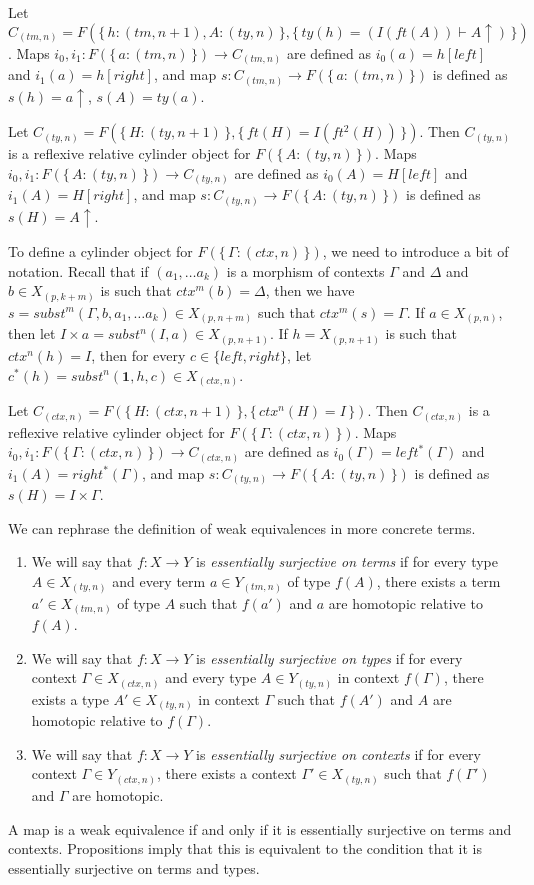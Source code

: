 \documentclass[reqno]{amsart}
\theoremstyle{definition}
\theoremstyle{remark}
\newcommand{\emptyCtx}{\mathbf{1}}
\newcommand{\cyli}{i}
\numberwithin{figure}{section}
\begin{document}
Let $C_{(tm,n)} = F(\{\,h : (tm,n+1), A : (ty,n)\,\}, \{\,ty(h) = (I(ft(A)) \vdash A\!\!\uparrow)\,\})$.
Maps $\cyli_0, \cyli_1 : F(\{\,a : (tm,n)\,\}) \to C_{(tm,n)}$ are defined as $\cyli_0(a) = h[left]$ and $\cyli_1(a) = h[right]$,
and map $s : C_{(tm,n)} \to F(\{\,a : (tm,n)\,\})$ is defined as $s(h) = a\!\!\uparrow$, $s(A) = ty(a)$.

Let $C_{(ty,n)} = F(\{\,H : (ty,n+1)\,\}, \{\,ft(H) = I(ft^2(H))\,\})$.
Then $C_{(ty,n)}$ is a reflexive relative cylinder object for $F(\{\,A : (ty,n)\,\})$.
Maps $\cyli_0, \cyli_1 : F(\{\,A : (ty,n)\,\}) \to C_{(ty,n)}$ are defined as $\cyli_0(A) = H[left]$ and $\cyli_1(A) = H[right]$,
and map $s : C_{(ty,n)} \to F(\{\,A : (ty,n)\,\})$ is defined as $s(H) = A\!\!\uparrow$.

To define a cylinder object for $F(\{\,\Gamma : (ctx,n)\,\})$, we need to introduce a bit of notation.
Recall that if $(a_1, \ldots a_k)$ is a morphism of contexts $\Gamma$ and $\Delta$ and $b \in X_{(p,k+m)}$ is such that $ctx^m(b) = \Delta$,
then we have $s = subst^m(\Gamma, b, a_1, \ldots a_k) \in X_{(p,n+m)}$ such that $ctx^m(s) = \Gamma$.
If $a \in X_{(p,n)}$, then let $I \times a = subst^n(I, a) \in X_{(p,n+1)}$.
If $h = X_{(p,n+1)}$ is such that $ctx^n(h) = I$, then for every $c \in \{ left, right \}$, let $c^*(h) = subst^n(\emptyCtx, h, c) \in X_{(ctx,n)}$.

Let $C_{(ctx,n)} = F(\{\,H : (ctx,n+1)\,\}, \{\,ctx^n(H) = I\,\})$.
Then $C_{(ctx,n)}$ is a reflexive relative cylinder object for $F(\{\,\Gamma : (ctx,n)\,\})$.
Maps $\cyli_0, \cyli_1 : F(\{\,\Gamma : (ctx,n)\,\}) \to C_{(ctx,n)}$ are defined as $\cyli_0(\Gamma) = left^*(\Gamma)$ and $\cyli_1(A) = right^*(\Gamma)$,
and map $s : C_{(ty,n)} \to F(\{\,A : (ty,n)\,\})$ is defined as $s(H) = I \times \Gamma$.

We can rephrase the definition of weak equivalences in more concrete terms.
\begin{enumerate}
\item We will say that $f : X \to Y$ is \emph{essentially surjective on terms} if
for every type $A \in X_{(ty,n)}$ and every term $a \in Y_{(tm,n)}$ of type $f(A)$,
there exists a term $a' \in X_{(tm,n)}$ of type $A$ such that $f(a')$ and $a$ are homotopic relative to $f(A)$.
\item We will say that $f : X \to Y$ is \emph{essentially surjective on types} if
for every context $\Gamma \in X_{(ctx,n)}$ and every type $A \in Y_{(ty,n)}$ in context $f(\Gamma)$,
there exists a type $A' \in X_{(ty,n)}$ in context $\Gamma$ such that $f(A')$ and $A$ are homotopic relative to $f(\Gamma)$.
\item We will say that $f : X \to Y$ is \emph{essentially surjective on contexts} if
for every context $\Gamma \in Y_{(ctx,n)}$, there exists a context $\Gamma' \in X_{(ty,n)}$ such that $f(\Gamma')$ and $\Gamma$ are homotopic.
\end{enumerate}
A map is a weak equivalence if and only if it is essentially surjective on terms and contexts.
Propositions  imply that this is equivalent to the condition that it is essentially surjective on terms and types.
\end{document}
